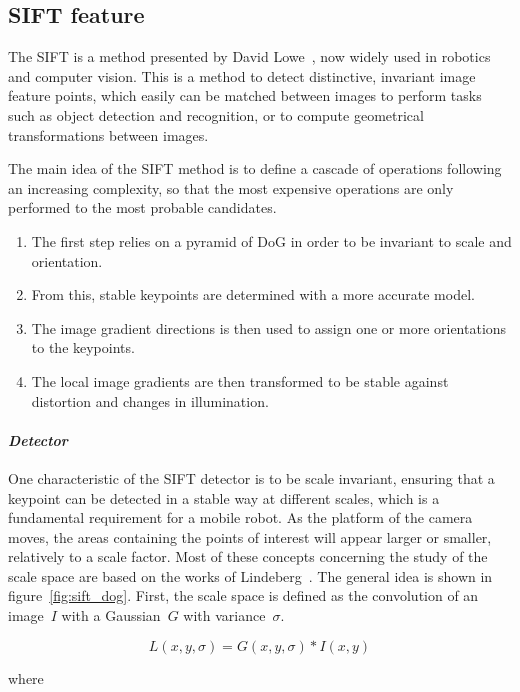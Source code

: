 \subsection{SIFT feature}

The \gls{SIFT} is a method presented by David Lowe~\cite{lowe_2004_sift}, now widely used in robotics and computer vision.
This is a method to detect distinctive, invariant image feature points, which easily can be matched between images to perform tasks such as object detection and recognition, or to compute geometrical transformations between images.

The main idea of the \gls{SIFT} method is to define a cascade of operations following an increasing complexity, so that the most expensive operations are only performed to the most probable candidates.
\begin{enumerate}
\item The first step relies on a pyramid of \gls{DoG} in order to be invariant to scale and orientation.
\item From this, stable keypoints are determined with a more accurate model.
\item The image gradient directions is then used to assign one or more orientations to the keypoints.
\item The local image gradients are then transformed to be stable against distortion and changes in illumination.
\end{enumerate}

\clearpage
\paragraph{\emph{Detector}}

One characteristic of the SIFT detector is to be scale invariant, ensuring that a keypoint can be detected in a stable way at different scales, which is a fundamental requirement for a mobile robot. As the platform of the camera moves, the areas containing the points of interest will appear larger or smaller, relatively to a scale factor. Most of these concepts concerning the study of the scale space are based on the works of Lindeberg~\cite{Lindeberg_1994}. The general idea is shown in figure~\ref{fig:sift_dog}. First, the scale space is defined as the convolution of an image~$I$ with a Gaussian~$G$ with variance~$\sigma$.

\[ L(x,y,\sigma) = G(x,y,\sigma) * I(x,y) \]

where

